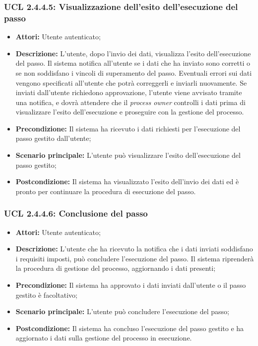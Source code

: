 \subsubsection{UCL 2.4.4.5: Visualizzazione dell'esito dell'esecuzione del passo}
\begin{itemize}
\item \textbf{Attori:} Utente autenticato;
\item \textbf{Descrizione:} L'utente, dopo l'invio dei dati, visualizza l'esito dell'esecuzione del passo. Il sistema notifica all'utente se i dati che ha inviato sono corretti o se non soddisfano i vincoli di superamento del passo.
Eventuali errori sui dati vengono specificati all'utente che potrà correggerli e inviarli nuovamente.
Se inviati dall'utente richiedono approvazione, l'utente viene avvisato tramite una notifica, e dovrà attendere che il \textit{process owner} controlli i dati prima di visualizzare l'esito dell'esecuzione e proseguire con la gestione del processo.
\item \textbf{Precondizione:} Il sistema ha ricevuto i dati richiesti per l'esecuzione del passo gestito dall'utente;
\item \textbf{Scenario principale:} L'utente può visualizzare l'esito dell'esecuzione del passo gestito;
\item \textbf{Postcondizione:} Il sistema ha visualizzato l'esito dell'invio dei dati ed è pronto per continuare la procedura di esecuzione del passo.
\end{itemize}

\hypertarget{L2.4.4.6}{}
\subsubsection{UCL 2.4.4.6: Conclusione del passo}
\begin{itemize}
\item \textbf{Attori:} Utente autenticato;
\item \textbf{Descrizione:} L'utente che ha ricevuto la notifica che i dati inviati soddisfano i requisiti imposti, può concludere l'esecuzione del passo. Il sistema riprenderà la procedura di gestione del processo, aggiornando i dati presenti;
\item \textbf{Precondizione:} Il sistema ha approvato i dati inviati dall'utente o il passo gestito è facoltativo;
\item \textbf{Scenario principale:} L'utente può concludere l'esecuzione del passo;
\item \textbf{Postcondizione:} Il sistema ha concluso l'esecuzione del passo gestito e ha aggiornato i dati sulla gestione del processo in esecuzione.
\end{itemize}


